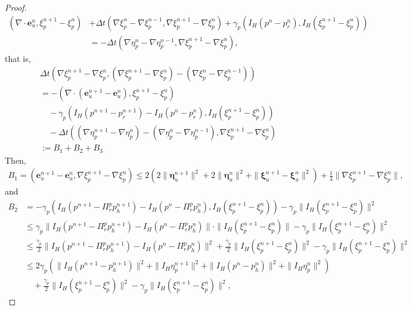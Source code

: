 \documentclass[10pt,twoside,openany,UTF8,CJK]{article}
\begin{document}
\begin{proof}
$$\begin{aligned}
		(\nabla\cdot \boldsymbol{e}^{n}_u, \xi^{n+1}_p - \xi^{n}_p) &+ \Delta t(\nabla\xi^{n}_p - \nabla\xi^{n-1}_p, \nabla \xi^{n+1}_p - \nabla\xi^{n}_p) + \gamma_p(I_H(p^{n}-p^{n}_r), I_H(\xi^{n+1}_p - \xi^{n}_p)) \\
		&= -\Delta t(\nabla\eta^{n}_p - \nabla\eta^{n-1}_p, \nabla \xi^{n+1}_p - \nabla\xi^{n}_p),
    \end{aligned}
    $$		
	that is,	
	$$
	\begin{aligned}	
		&\Delta t(\nabla\xi^{n+1}_p - \nabla\xi^{n}_p, (\nabla\xi^{n+1}_p - \nabla\xi^{n}_p) - (\nabla\xi^{n}_p - \nabla\xi^{n-1}_p)) \\
		&= -(\nabla\cdot (\boldsymbol{e}^{n+1}_u - \boldsymbol{e}^{n}_u), \xi^{n+1}_p - \xi^{n}_p) \\
		&\quad- \gamma_p(I_H(p^{n+1}-p^{n+1}_r) - I_H(p^{n}-p^{n}_r), I_H(\xi^{n+1}_p - \xi^{n}_p)) \\
		&\quad- \Delta t((\nabla\eta^{n+1}_p - \nabla\eta^{n}_p) - (\nabla\eta^{n}_p - \nabla\eta^{n-1}_p), \nabla \xi^{n+1}_p - \nabla\xi^{n}_p) \\
		&:= B_1 + B_2 + B_3
    \end{aligned}
    $$	
	Then, 	
	$$
	\begin{aligned}		
		B_1 = (\boldsymbol{e}^{n+1}_u - \boldsymbol{e}^{n}_u, \nabla \xi^{n+1}_p - \nabla \xi^{n}_p) 
		\leq 2\left(2\|\boldsymbol{\eta}^{n+1}_u\|^2 + 2\|\boldsymbol{\eta}^{n}_u\|^2 + \|\boldsymbol{\xi}^{n+1}_u - \boldsymbol{\xi}^{n}_u\|^2\right) + \frac{1}{4}\|\nabla \xi^{n+1}_p - \nabla \xi^{n}_p\|,
	\end{aligned}
    $$
    and
    $$
    \begin{aligned}	
		B_2 &= -\gamma_p(I_H(p^{n+1}-\Pi^p_rp^{n+1}_h) - I_H(p^{n}-\Pi^p_rp^{n}_h), I_H(\xi^{n+1}_p - \xi^{n}_p)) - \gamma_p\|I_H(\xi^{n+1}_p - \xi^{n}_p)\|^2 \\
		&\leq \gamma_p\|I_H(p^{n+1}-\Pi^p_rp^{n+1}_h) - I_H(p^{n}-\Pi^p_rp^{n}_h)\|\cdot\|I_H(\xi^{n+1}_p - \xi^{n}_p)\| - \gamma_p\|I_H(\xi^{n+1}_p - \xi^{n}_p)\|^2 \\
		&\leq \frac{\gamma_p}{2}\|I_H(p^{n+1}-\Pi^p_rp^{n+1}_h) - I_H(p^{n}-\Pi^p_rp^{n}_h)\|^2 + \frac{\gamma_p}{2}\|I_H(\xi^{n+1}_p - \xi^{n}_p)\|^2 - \gamma_p\|I_H(\xi^{n+1}_p - \xi^{n}_p)\|^2 \\
		&\leq 2\gamma_p\left(\|I_H(p^{n+1} - p^{n+1}_h)\|^2 + \|I_H\eta^{n+1}_p\|^2 + \|I_H(p^{n} - p^{n}_h)\|^2 + \|I_H\eta^n_p\|^2\right) \\
		&\quad+ \frac{\gamma_p}{2}\|I_H(\xi^{n+1}_p - \xi^{n}_p)\|^2 - \gamma_p\|I_H(\xi^{n+1}_p - \xi^{n}_p)\|^2,

\end{aligned}$$
\end{proof}
\end{document}
